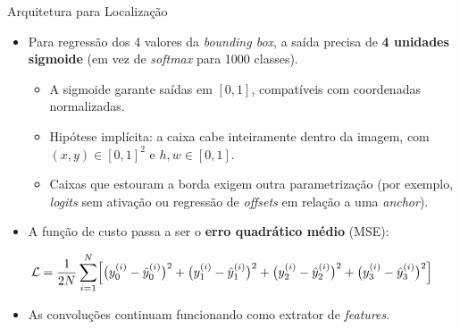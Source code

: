 \documentclass[aspectratio=169,xcolor=dvipsnames]{beamer}
\begin{document}
\begin{frame}{Arquitetura para Localização}
\begin{itemize}
    \item Para regressão dos 4 valores da \textit{bounding box}, a saída precisa de \textbf{4 unidades sigmoide} (em vez de \textit{softmax} para 1000 classes).
    \begin{itemize}
        \item A sigmoide garante saídas em $[0, 1]$, compatíveis com coordenadas normalizadas.
        \item Hipótese implícita: a caixa cabe inteiramente dentro da imagem, com $(x, y) \in [0,1]^2$ e $h, w \in [0,1]$.
        \item Caixas que estouram a borda exigem outra parametrização (por exemplo, \textit{logits} sem ativação ou regressão de \textit{offsets} em relação a uma \textit{anchor}).
    \end{itemize}
    \item A função de custo passa a ser o \textbf{erro quadrático médio} (MSE):
\end{itemize}
\begin{equation*}
\mathcal{L} = \frac{1}{2N}\sum_{i=1}^{N}\Bigl[\bigl(y_0^{(i)} - \hat{y}_0^{(i)}\bigr)^2 + \bigl(y_1^{(i)} - \hat{y}_1^{(i)}\bigr)^2 + \bigl(y_2^{(i)} - \hat{y}_2^{(i)}\bigr)^2 + \bigl(y_3^{(i)} - \hat{y}_3^{(i)}\bigr)^2\Bigr]
\end{equation*}
\begin{itemize}
    \item As convoluções continuam funcionando como extrator de \textit{features}.
\end{itemize}
\end{frame}
\end{document}
